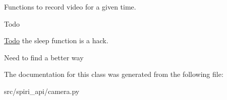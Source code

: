 \-Functions to record video for a given time. 

\begin{DoxyRefDesc}{\-Todo}
\item[\hyperlink{todo__todo000002}{\-Todo}]the sleep function is a hack.\end{DoxyRefDesc}
\-Need to find a better way 

\-The documentation for this class was generated from the following file\-:\begin{DoxyCompactItemize}
\item 
src/spiri\-\_\-api/camera.\-py\end{DoxyCompactItemize}
